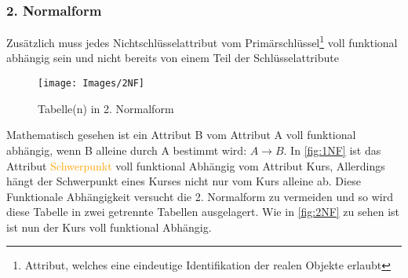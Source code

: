 \subsubsection*{2. Normalform}
Zusätzlich muss jedes Nichtschlüsselattribut vom Primärschlüssel\footnote{Attribut, welches eine eindeutige Identifikation der realen Objekte erlaubt\cite{Wikipedia:Primärschlüssel}} voll funktional abhängig sein und nicht bereits von einem Teil der Schlüsselattribute
\begin{figure}[H]
	\begin{center}
		\texttt{[image: Images/2NF]}
		\caption{Tabelle(n) in 2. Normalform\cite{Knott:Normalformen}}
		\label{fig:2NF}
	\end{center}
\end{figure}
Mathematisch gesehen ist ein Attribut B vom Attribut A voll funktional abhängig, wenn B alleine durch A bestimmt wird: $A\rightarrow B$.
In \autoref{fig:1NF} ist das Attribut \colorbox[rgb]{.8,.8,.8}{\textcolor{orange}{Schwerpunkt}} voll funktional Abhängig vom Attribut Kurs, Allerdings hängt der Schwerpunkt eines Kurses nicht nur vom Kurs alleine ab. Diese Funktionale Abhängigkeit versucht die 2. Normalform zu vermeiden und so wird diese Tabelle in zwei getrennte Tabellen ausgelagert.
Wie in \autoref{fig:2NF} zu sehen ist ist nun der Kurs voll funktional Abhängig.

